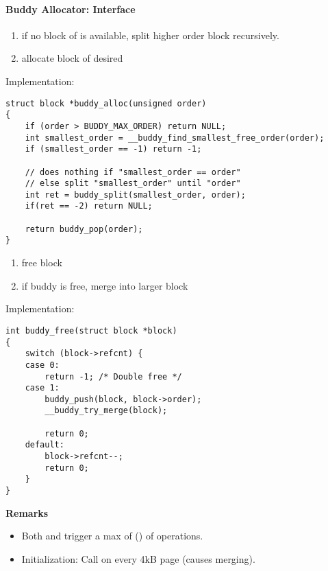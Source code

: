 \paragraph{Buddy Allocator: Interface}
\begin{enumerate}
    \item if no block of  is available, split higher order block recursively.
    \item allocate block of desired 
\end{enumerate}

Implementation:
\begin{lstlisting}[style=bright_C++]
struct block *buddy_alloc(unsigned order)
{
    if (order > BUDDY_MAX_ORDER) return NULL;
    int smallest_order = __buddy_find_smallest_free_order(order);
    if (smallest_order == -1) return -1;

    // does nothing if "smallest_order == order"
    // else split "smallest_order" until "order"
    int ret = buddy_split(smallest_order, order);
    if(ret == -2) return NULL;

    return buddy_pop(order);
}
\end{lstlisting}

\newpar{}
\begin{enumerate}
    \item free block
    \item if buddy is free, merge into larger block
\end{enumerate}

Implementation:
\begin{lstlisting}[style=bright_C++]
int buddy_free(struct block *block)
{
    switch (block->refcnt) {
    case 0:
        return -1; /* Double free */
    case 1:
        buddy_push(block, block->order);
        __buddy_try_merge(block);

        return 0;
    default:
        block->refcnt--;
        return 0;
    }
}
\end{lstlisting}

\textbf{Remarks}
\begin{itemize}
    \item Both  and  trigger a max of () of operations. %
    \item Initialization: Call  on every 4kB page (causes merging).
\end{itemize}

